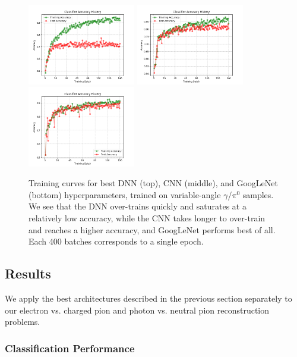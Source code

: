 \begin{figure}[htbp]
\centering
\includegraphics[width=0.42\textwidth]{Images/Calo/DNN_accuracy_batches_long.png}
\includegraphics[width=0.42\textwidth]{Images/Calo/CNN_accuracy_batches_long.png}
\includegraphics[width=0.42\textwidth]{Images/Calo/GN_accuracy_batches_long.png}
\caption{Training curves for best DNN (top), CNN (middle), and GoogLeNet (bottom) hyperparameters, trained on variable-angle $\gamma$/$\pi^0$ samples. We see that the DNN over-trains quickly and saturates at a relatively low accuracy, while the CNN takes longer to over-train and reaches a higher accuracy, and GoogLeNet performs best of all. Each 400 batches corresponds to a single epoch.}
\label{fig:training_curves_comparison_gamma_pi0}
\end{figure}

\subsection{Results}

We apply the best architectures described in the previous section separately to our electron vs. charged pion and photon vs. neutral pion reconstruction problems.

\subsubsection{Classification Performance}
\label{sec:classification}

